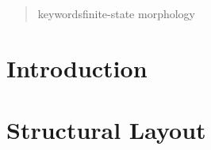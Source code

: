 \documentclass{llncs}
\begin{document}
%
%
\author{Author Names\inst{}}


\maketitle
%

\makeatletter
\renewenvironment{thebibliography}[1]
     {\section*{\refname}
      \small
      \list{}%
           {\settowidth\labelwidth{}%
            \leftmargin\parindent
            \itemindent=-\parindent
            \labelsep=\z@
            \if@openbib
              \advance\leftmargin\bibindent
              \itemindent -\bibindent
              \listparindent \itemindent
              \parsep \z@
            \fi
            \usecounter{enumiv}%
            \let\p@enumiv\@empty
            \renewcommand\theenumiv{}}%
      \if@openbib
        \renewcommand\newblock{\par}%
      \else
        \renewcommand\newblock{\hskip .11em \@plus.33em \@minus.07em}%
      \fi
      \sloppy\clubpenalty4000\widowpenalty4000%
      \sfcode`\.=\@m}
     {\def\@noitemerr
       {\@latex@warning{Empty `thebibliography' environment}}%
      \endlist}
      \def\@cite#1{#1}%
      \def\@lbibitem[#1]#2{\item[]\if@filesw
        {\def\protect##1{\string ##1\space}\immediate
      \write\@auxout{\string\bibcite{#2}{#1}}}\fi\ignorespaces}
\makeatother
%
\begin{abstract}
keywords{finite-state morphology}
\end{abstract}

\chapter*{Introduction}


\chapter*{Structural Layout}
\end{document}
